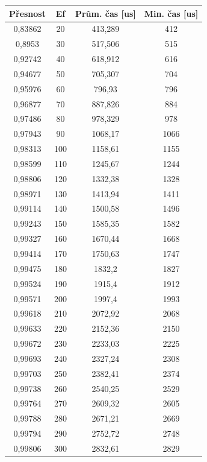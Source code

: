 \documentclass[czech,semestral,dept460,male,csharp,cpdeclaration]{diploma}
\begin{document}
		\begin{center}
			\begin{tabular}{c c c c}\label{HNSWM}
				
				Přesnost & Ef & Prům. čas [us] & Min. čas [us] \\
				\midrule
				0,83862 & 20 & 413,289 & 412 \\
				0,8953 & 30 & 517,506 & 515 \\
				0,92742 & 40 & 618,912 & 616 \\
				0,94677 & 50 & 705,307 & 704 \\
				0,95976 & 60 & 796,93 & 796 \\
				0,96877 & 70 & 887,826 & 884 \\
				0,97486 & 80 & 978,329 & 978 \\
				0,97943 & 90 & 1068,17 & 1066 \\
				0,98313 & 100 & 1158,61 & 1155 \\
				0,98599 & 110 & 1245,67 & 1244 \\
				0,98806 & 120 & 1332,38 & 1328 \\
				0,98971 & 130 & 1413,94 & 1411 \\
				0,99114 & 140 & 1500,58 & 1496 \\
				0,99243 & 150 & 1585,35 & 1582 \\
				0,99327 & 160 & 1670,44 & 1668 \\
				0,99414 & 170 & 1750,63 & 1747 \\
				0,99475 & 180 & 1832,2 & 1827 \\
				0,99524 & 190 & 1915,4 & 1912 \\
				0,99571 & 200 & 1997,4 & 1993 \\
				0,99618 & 210 & 2072,92 & 2068 \\
				0,99633 & 220 & 2152,36 & 2150 \\
				0,99672 & 230 & 2233,03 & 2225 \\
				0,99693 & 240 & 2327,24 & 2308 \\
				0,99703 & 250 & 2382,41 & 2374 \\
				0,99738 & 260 & 2540,25 & 2529 \\
				0,99764 & 270 & 2609,32 & 2605 \\
				0,99788 & 280 & 2671,21 & 2669 \\
				0,99794 & 290 & 2752,72 & 2748 \\
				0,99806 & 300 & 2832,61 & 2829 \\
			\end{tabular}
		
		\end{center}
		
\end{document}
